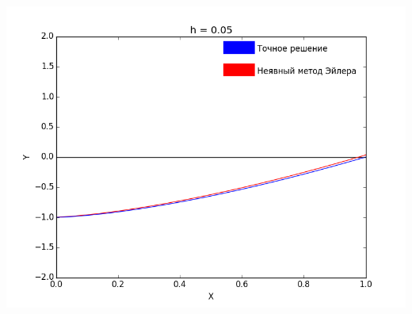 \documentclass[12pt,a4paper]{article}
\begin{document}
        \includegraphics[scale=0.45]{implicitEulerGraph_Step=0_05}
        
    \newpage
\end{document}
